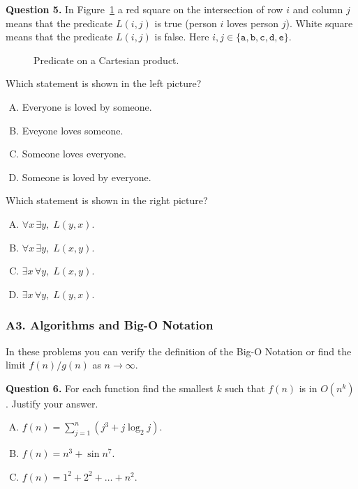 \documentclass[jou]{apa6}
\begin{document}
\vspace{6pt}
{\bf Question 5.} 
In Figure~\ref{fig:predicate-grid} a red square on the intersection 
of row $i$ and column $j$ 
means that the predicate $L(i,j)$ is true (person $i$ 
loves person $j$). White square means that the predicate $L(i,j)$
is false. Here 
$i,j \in \{ \mathtt{a},\mathtt{b},\mathtt{c},\mathtt{d},\mathtt{e} \}$. 
\begin{figure}[!htb]
\caption{\label{fig:predicate-grid} Predicate on a Cartesian product.}
\end{figure}

Which statement is shown in the left picture?
\begin{enumerate}[(A)]
\item Everyone is loved by someone.
\item Eveyone loves someone.
\item Someone loves everyone.
\item Someone is loved by everyone.
\end{enumerate}
Which statement is shown in the right picture?
\begin{enumerate}[(A)]
\item $\forall x\, \exists y,\;L(y,x)$. 
\item $\forall x\, \exists y,\;L(x,y)$. 
\item $\exists x\, \forall y,\;L(x,y)$. 
\item $\exists x\, \forall y,\;L(y,x)$. 
\end{enumerate}




\subsubsection{A3. Algorithms and Big-O Notation}

In these problems you can verify the definition of the Big-O Notation 
or find the limit $f(n)/g(n)$ as $n \rightarrow \infty$. 

{\bf Question 6.} For each function find the smallest
$k$ such that $f(n)$ is in $O(n^k)$. Justify your answer.
\begin{enumerate}[(A)]
\item $f(n) = \sum_{j=1}^{n} (j^3 + j \log_2 j)$. 
\item $f(n) = n^3 + \sin n^7$. 
\item $f(n) = 1^2 + 2^2 + \ldots + n^2$.
\end{enumerate}
\end{document}
